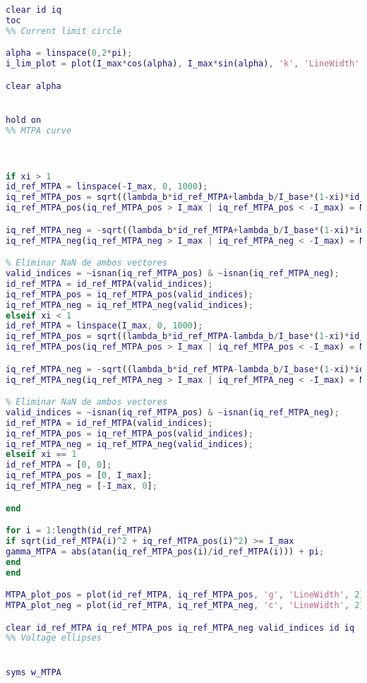 \begin{lstlisting}[language=Matlab, basicstyle=\ttfamily\small, breaklines=true, frame=single]
clear id iq
toc
%% Current limit circle

alpha = linspace(0,2*pi);
i_lim_plot = plot(I_max*cos(alpha), I_max*sin(alpha), 'k', 'LineWidth',2);

clear alpha


hold on
%% MTPA curve



if xi > 1
id_ref_MTPA = linspace(-I_max, 0, 1000);
iq_ref_MTPA_pos = sqrt((lambda_b*id_ref_MTPA+lambda_b/I_base*(1-xi)*id_ref_MTPA.^2)/(lambda_b/I_base*(1-xi)));
iq_ref_MTPA_pos(iq_ref_MTPA_pos > I_max | iq_ref_MTPA_pos < -I_max) = NaN;

iq_ref_MTPA_neg = -sqrt((lambda_b*id_ref_MTPA+lambda_b/I_base*(1-xi)*id_ref_MTPA.^2)/(lambda_b/I_base*(1-xi)));
iq_ref_MTPA_neg(iq_ref_MTPA_neg > I_max | iq_ref_MTPA_neg < -I_max) = NaN;

% Eliminar NaN de ambos vectores
valid_indices = ~isnan(iq_ref_MTPA_pos) & ~isnan(iq_ref_MTPA_neg);
id_ref_MTPA = id_ref_MTPA(valid_indices);
iq_ref_MTPA_pos = iq_ref_MTPA_pos(valid_indices);
iq_ref_MTPA_neg = iq_ref_MTPA_neg(valid_indices);
elseif xi < 1
id_ref_MTPA = linspace(I_max, 0, 1000);
iq_ref_MTPA_pos = sqrt((lambda_b*id_ref_MTPA-lambda_b/I_base*(1-xi)*id_ref_MTPA.^2)/(lambda_b/I_base*(1-xi)));
iq_ref_MTPA_pos(iq_ref_MTPA_pos > I_max | iq_ref_MTPA_pos < -I_max) = NaN;

iq_ref_MTPA_neg = -sqrt((lambda_b*id_ref_MTPA-lambda_b/I_base*(1-xi)*id_ref_MTPA.^2)/(lambda_b/I_base*(1-xi)));
iq_ref_MTPA_neg(iq_ref_MTPA_neg > I_max | iq_ref_MTPA_neg < -I_max) = NaN;

% Eliminar NaN de ambos vectores
valid_indices = ~isnan(iq_ref_MTPA_pos) & ~isnan(iq_ref_MTPA_neg);
id_ref_MTPA = id_ref_MTPA(valid_indices);
iq_ref_MTPA_pos = iq_ref_MTPA_pos(valid_indices);
iq_ref_MTPA_neg = iq_ref_MTPA_neg(valid_indices);
elseif xi == 1
id_ref_MTPA = [0, 0];
iq_ref_MTPA_pos = [0, I_max];
iq_ref_MTPA_neg = [-I_max, 0];

end

for i = 1:length(id_ref_MTPA)
if sqrt(id_ref_MTPA(i)^2 + iq_ref_MTPA_pos(i)^2) >= I_max
gamma_MTPA = abs(atan(iq_ref_MTPA_pos(i)/id_ref_MTPA(i))) + pi;
end
end

MTPA_plot_pos = plot(id_ref_MTPA, iq_ref_MTPA_pos, 'g', 'LineWidth', 2);
MTPA_plot_neg = plot(id_ref_MTPA, iq_ref_MTPA_neg, 'c', 'LineWidth', 2);

clear id_ref_MTPA iq_ref_MTPA_pos iq_ref_MTPA_neg valid_indices id iq
%% Voltage ellipses


syms w_MTPA


\end{lstlisting}
